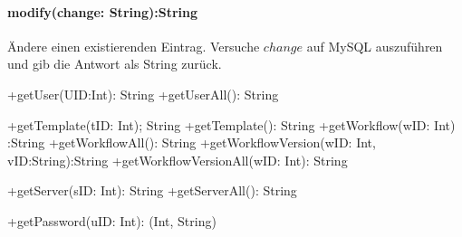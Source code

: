 \paragraph{modify(change: String):String} Ändere einen existierenden Eintrag. Versuche $change$ auf MySQL auszuführen und gib die Antwort als String zurück.






+getUser(UID:Int): String
+getUserAll(): String

+getTemplate(tID: Int); String
+getTemplate(): String
+getWorkflow(wID: Int) :String
+getWorkflowAll(): String
+getWorkflowVersion(wID: Int, vID:String):String
+getWorkflowVersionAll(wID: Int): String


+getServer(sID: Int): String
+getServerAll(): String

+getPassword(uID: Int): (Int, String)





















\newpage